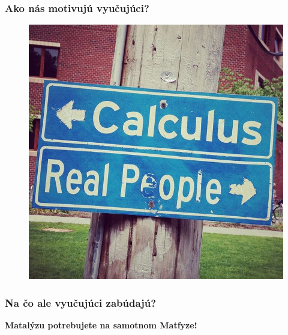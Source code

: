 \documentclass{beamer}
\begin{document}
\begin{frame}
\frametitle{Ako nás motivujú vyučujúci?}
\begin{figure}
\includegraphics[height=0.8\textheight]{images/razcestnik.jpg}
\end{figure}
\end{frame}

% 

\begin{frame}
\frametitle{Na čo ale vyučujúci zabúdajú?}
\pause
\begin{center}
\textbf{{\Large Matalýzu potrebujete na samotnom Matfyze!}}
\end{center}
\end{frame}
\end{document}
